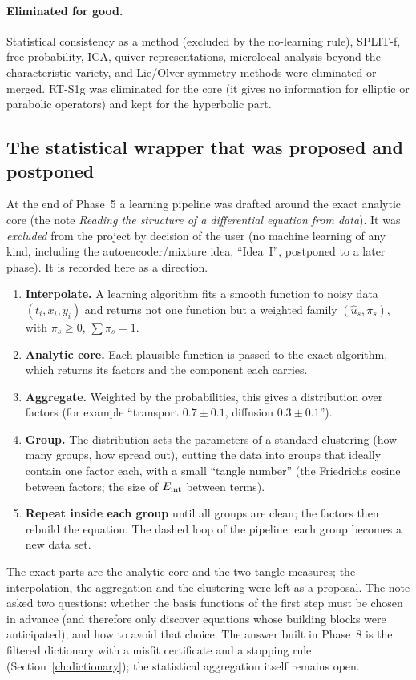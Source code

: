 \documentclass[11pt]{article}
\theoremstyle{plain}
\theoremstyle{definition}
\theoremstyle{remark}
\begin{document}
\paragraph{Eliminated for good.} Statistical consistency as a method (excluded by the no-learning rule), SPLIT-f, free probability, ICA, quiver representations, microlocal analysis beyond the characteristic variety, and Lie/Olver symmetry methods were eliminated or merged. RT-S1g was eliminated for the core (it gives no information for elliptic or parabolic operators) and kept for the hyperbolic part.

\subsection{The statistical wrapper that was proposed and postponed}

At the end of Phase~5 a learning pipeline was drafted around the exact analytic core (the note \emph{Reading the structure of a differential equation from data}). It was \emph{excluded} from the project by decision of the user (no machine learning of any kind, including the autoencoder/mixture idea, ``Idea~I'', postponed to a later phase). It is recorded here as a direction.

\begin{enumerate}
\item \textbf{Interpolate.} A learning algorithm fits a smooth function to noisy data $(t_i,x_i,y_i)$ and returns not one function but a weighted family $(\hat u_s,\pi_s)$, with $\pi_s\ge0$, $\sum\pi_s=1$.
\item \textbf{Analytic core.} Each plausible function is passed to the exact algorithm, which returns its factors and the component each carries.
\item \textbf{Aggregate.} Weighted by the probabilities, this gives a distribution over factors (for example ``transport $0.7\pm0.1$, diffusion $0.3\pm0.1$'').
\item \textbf{Group.} The distribution sets the parameters of a standard clustering (how many groups, how spread out), cutting the data into groups that ideally contain one factor each, with a small ``tangle number'' (the Friedrichs cosine between factors; the size of $E_{\rm int}$ between terms).
\item \textbf{Repeat inside each group} until all groups are clean; the factors then rebuild the equation. The dashed loop of the pipeline: each group becomes a new data set.
\end{enumerate}
The exact parts are the analytic core and the two tangle measures; the interpolation, the aggregation and the clustering were left as a proposal. The note asked two questions: whether the basis functions of the first step must be chosen in advance (and therefore only discover equations whose building blocks were anticipated), and how to avoid that choice. The answer built in Phase~8 is the filtered dictionary with a misfit certificate and a stopping rule (Section~\ref{ch:dictionary}); the statistical aggregation itself remains open.
\end{document}
